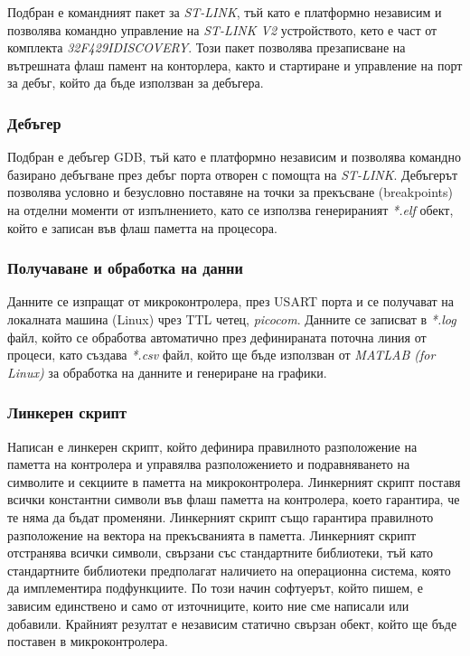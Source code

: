 Подбран е командният пакет за \textit{ST-LINK}, тъй като е платформно независим и позволява командно управление на \textit{ST-LINK V2} устройството,
кето е част от комплекта \textit{32F429IDISCOVERY}. Този пакет позволява презаписване на вътрешната флаш памент на конторлера,
както и стартиране и управление на порт за дебъг, който да бъде използван за дебъгера.


\subsubsection{Дебъгер}

Подбран е дебъгер GDB, тъй като е платформно независим и позволява командно базирано дебъгване през дебъг порта отворен с помощта на \textit{ST-LINK}.
Дебъгерът позволява условно и безусловно поставяне на точки за прекъсване (breakpoints) на отделни моменти от изпълнението, 
като се използва генерираният \textit{*.elf} обект,
който е записан във флаш паметта на процесора.

\subsubsection{Получаване и обработка на данни}

Данните се изпращат от микроконтролера, през USART порта и се получават на локалната машина (Linux) чрез TTL четец, \textit{picocom}.
Данните се записват в \textit{*.log} файл, който се обработва автоматично през дефинираната поточна линия от процеси, като създава \textit{*.csv} файл,
който ще бъде използван от \textit{MATLAB (for Linux)} за обработка на данните и генериране на графики.


\subsubsection{Линкерен скрипт}

Написан е линкерен скрипт, който дефинира правилното разположение на паметта на
контролера и управялва разположението и подравняването на символите и секциите в паметта на микроконтролера.
Линкерният скрипт поставя всички константни символи във флаш паметта на контролера, което гарантира, че те няма да бъдат променяни.
Линкерният скрипт също гарантира правилното разположение на вектора на прекъсванията в паметта.
Линкерният скрипт отстранява всички символи, свързани със стандартните библиотеки, 
тъй като стандартните библиотеки предполагат наличието на операционна система, 
която да имплементира подфункциите.
По този начин софтуерът, който пишем, е зависим единствено и само от източниците, които ние сме написали или добавили.
Крайният резултат е независим статично свързан обект, който ще бъде поставен в микроконтролера.
